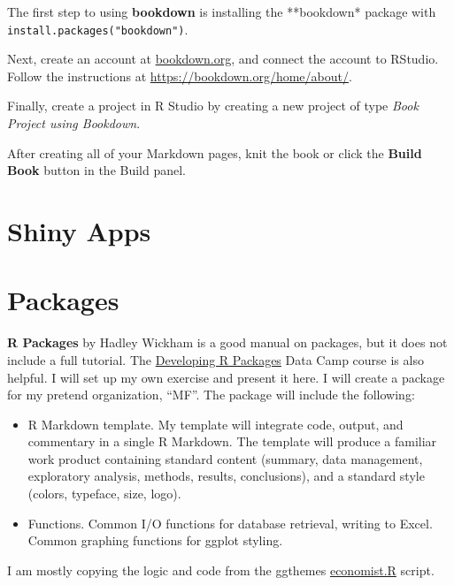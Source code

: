 \documentclass[
]{book}
\begin{document}
The first step to using \textbf{bookdown} is installing the **bookdown* package with \texttt{install.packages("bookdown")}.

Next, create an account at \href{http://bookdown.org}{bookdown.org}, and connect the account to RStudio. Follow the instructions at \url{https://bookdown.org/home/about/}.

Finally, create a project in R Studio by creating a new project of type \emph{Book Project using Bookdown}.

After creating all of your Markdown pages, knit the book or click the \textbf{Build Book} button in the Build panel.

\hypertarget{shiny-apps}{%
\section*{Shiny Apps}\label{shiny-apps}}

\hypertarget{packages}{%
\section*{Packages}\label{packages}}

\textbf{R Packages} \citep{Wickham2015} by Hadley Wickham is a good manual on packages, but it does not include a full tutorial. The \href{https://campus.datacamp.com/courses/developing-r-packages/}{Developing R Packages} Data Camp course is also helpful. I will set up my own exercise and present it here. I will create a package for my pretend organization, ``MF''. The package will include the following:

\begin{itemize}
\item
  R Markdown template. My template will integrate code, output, and commentary in a single R Markdown. The template will produce a familiar work product containing standard content (summary, data management, exploratory analysis, methods, results, conclusions), and a standard style (colors, typeface, size, logo).
\item
  Functions. Common I/O functions for database retrieval, writing to Excel. Common graphing functions for ggplot styling.
\end{itemize}

I am mostly copying the logic and code from the ggthemes \href{https://rdrr.io/cran/ggthemes/src/R/economist.R}{economist.R} script.
\end{document}
